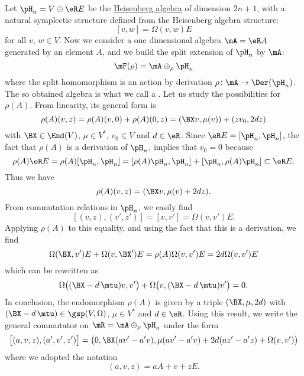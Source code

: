 Let $\pH_{n}=V\oplus\eR E$ be the \hyperlink{HyperHeisenberg}{Heisenberg algebra} of dimension $2n+1$, with a natural symplectic structure defined from the Heisenberg algebra structure:
 \[
[v,w]=\Omega(v,w)E
\]
for all $v$, $w\in V$. Now we consider a one dimensional algebra $\mA=\eR A$ generated by an element $A$, and we build the split extension of $\pH_{n}$ by $\mA$:
\begin{equation}
\mF(\rho)=\mA\oplus_{\rho}\pH_{n}
\end{equation}
where the split homomorphism is an action by derivation $\rho\colon \mA\to \Der(\pH_{n})$. The so obtained algebra is what we call a . Let us study the possibilities for $\rho(A)$. From linearity, its general form is 
\[ 
 \rho(A)(v,z)=\rho(A)(v,0)+\rho(A)(0,z)
	=(\BX v,\mu(v))+(zv_{0},2dz)
\]
with $\BX \in\End(V)$, $\mu\in V^*$, $v_{0}\in V$ and $d\in\eR$. Since $\eR E=[\pH_{n},\pH_{n}]$, the fact that $\rho(A)$ is a derivation of $\pH_{n}$, implies that $v_{0}=0$ because
\begin{equation}
   \rho(A)\eR E=\rho(A)[\pH_{n},\pH_{n}]
		=[\rho(A)\pH_{n},\pH_{n}]+[\pH_{n},\rho(A)\pH_{n}]\subset \eR E.
\end{equation}
Thus we have
\begin{equation}    \label{EqrhoBmudz}
\rho(A)(v,z)=(\BX v,\mu(v)+2dz).
\end{equation}
From commutation relations in $\pH_{n}$, we easily find 
\[ 
  [(v,z),(v',z')]=[v,v']=\Omega(v,v')E.
\]
Applying $\rho(A)$ to this equality, and using the fact that this is a derivation, we find
\[ 
  \Omega(\BX ,v')E+\Omega(v,\BX ')E=\rho(A)\Omega(v,v')E=2d\Omega(v,v')E
\]
which can be rewritten as
\begin{equation}
\Omega\big( (\BX -d\,\mtu)v,v' \big)+\Omega\big( v,(\BX -d\,\mtu)v' \big)=0.
\end{equation}
In conclusion, the endomorphism $\rho(A)$ is given by a triple $(\BX ,\mu,2d)$ with $(\BX -d\,\mtu)\in\gsp(V,\Omega)$, $\mu\in V^*$ and $d\in\eR$. Using this result, we write the general commutator on $\mR=\mA\oplus_{\rho}\pH_{n}$ under the form
\begin{equation}  \label{EqGeneExtHeizCom}
\big[ (a,v,z),(a',v',z') \big]=\big( 0,\BX (av'-a'v),\mu(av'-a'v)+2d(az'-a'z)+\Omega(v,v') \big)
\end{equation}
where we adopted the notation
\begin{equation} 
(a,v,z)=aA+v+zE.
\end{equation}

